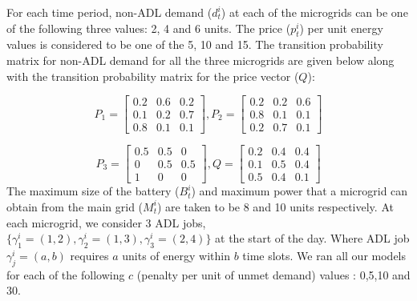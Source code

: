 For each time period, non-ADL demand ($d_t^i$) at each of the microgrids can be one of the following  three values: 2, 4 and 6 units. The price ($p_t^i$) per unit energy values is considered to be one of the 5, 10 and 15. 
The  transition probability matrix for non-ADL demand for all the three microgrids are given below along with the transition probability matrix for the price vector ($Q$):

\[P_{1}= \left[ \begin{array}{ccc}
0.2 & 0.6 & 0.2 \\
0.1 & 0.2 & 0.7 \\
0.8 & 0.1 & 0.1
\end{array} \right],
%
P_{2}=
\left[ \begin{array}{ccc}
0.2 & 0.2 & 0.6 \\
0.8 & 0.1 & 0.1 \\
0.2 & 0.7 & 0.1
\end{array} \right]
\]

\[P_{3}= \left[ \begin{array}{ccc}
0.5 & 0.5 & 0 \\
0 & 0.5 & 0.5 \\
1 & 0 & 0
\end{array} \right],
%
Q=
\left[ \begin{array}{ccc}
0.2 & 0.4 & 0.4 \\
0.1 & 0.5 & 0.4 \\
0.5 & 0.4 & 0.1
\end{array} \right]
\]
The maximum size of the battery ($B_t^i$) and maximum power that a microgrid can obtain from the main grid ($M_t^i$) are taken to be 8 and 10 units respectively.
At each microgrid, we consider 3 ADL jobs, $\{\gamma_{1}^{i} =  (1,2), \gamma_{2}^{i} =  (1,3),  \gamma_{3}^{i} =  (2,4)\}$ at the start of the day. Where ADL job $\gamma_{j}^{i} =  (a,b)$ requires $a$ units of energy within $b$ time slots. %
We ran all our models for each of the following $c$ (penalty per unit of unmet demand) values : 0,5,10 and 30.
